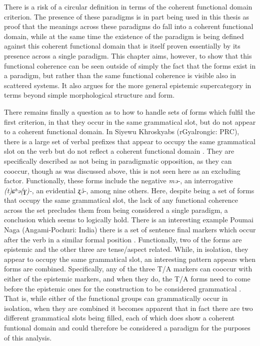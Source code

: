 There is a risk of a circular definition in terms of the coherent functional domain criterion. The presence of these paradigms is in part being used in this thesis as proof that the meanings across these paradigms do fall into a coherent functional domain, while at the same time the existence of the paradigm is being defined against this coherent functional domain that is itself proven essentially by its presence across a single paradigm. This chapter aims, however, to show that this functional coherence can be seen outside of simply the fact that the forms exist in a paradigm, but rather than the same functional coherence is visible also in scattered systems. It also argues for the more general epistemic supercategory in terms beyond simple morphological structure and form.

There remains finally a question as to how to handle sets of forms which fulfil the first criterion, in that they occur in the same grammatical slot, but do not appear to a coherent functional domain. In Siyewu Khroskyabs (rGyalrongic: PRC), there is a large set of verbal prefixes that appear to occupy the same grammatical slot on the verb but do not reflect a coherent functional domain \cite[34]{TaylorAdams2020}. They are specifically described as not being in paradigmatic opposition, as they can cooccur, though as was discussed above, this is not seen here as an excluding factor. Functionally, these forms include the negative \textit{mə-}, an interrogative \textit{(t)ɕʰə(ɣ)-}, an evidential \textit{ʐə̂-}, among nine others. Here, despite being a set of forms that occupy the same grammatical slot, the lack of any functional coherence across the set precludes them from being considered a single paradigm, a conclusion which seems to logically hold. There is an interesting example Poumai Naga (Angami-Pochuri: India) there is a set of sentence final markers which occur after the verb in a similar formal position \cite{Veikho2021}. Functionally, two of the forms are epistemic and the other three are tense/aspect related. While, in isolation, they appear to occupy the same grammatical slot, an interesting pattern appears when forms are combined. Specifically, any of the three T/A markers can cooccur with either of the epistemic markers, and when they do, the T/A forms need to come before the epistemic ones for the construction to be considered grammatical \cite[278]{Veikho2021}. That is, while either of the functional groups can grammatically occur in isolation, when they are combined it becomes apparent that in fact there are two different grammatical slots being filled, each of which does show a coherent funtional domain and could therefore be considered a paradigm for the purposes of this analysis.

